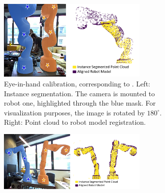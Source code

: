 




\begin{figure}
     \centering
     \begin{subfigure}[b]{\textwidth}
         \centering
         \includegraphics[width=0.8\textwidth]{img/visual_calibration/self_registration_combined_white.png}
         \caption{Eye-in-hand calibration, corresponding to . Left: Instance segmentation. The camera is mounted to robot one, highlighted through the blue mask. For visualization purposes, the image is rotated by $180^{\circ}$. Right: Point cloud to robot model registration.}
         \label{c1:fig:self_registration}
     \end{subfigure}
     \hfill
     \begin{subfigure}[b]{\textwidth}
         \centering
         \includegraphics[width=0.8\textwidth]{img/visual_calibration/double_registration_combined_white.png}

\end{subfigure}
\end{figure}
